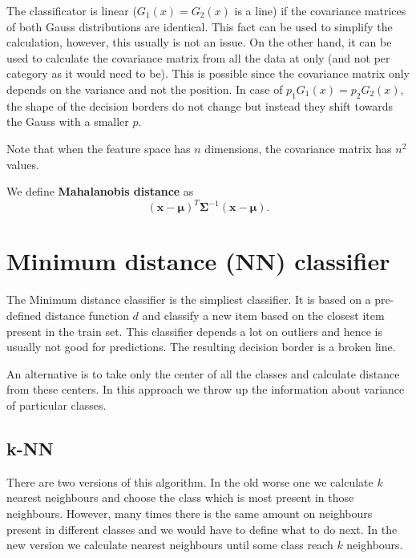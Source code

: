 \begin{remark}
The classificator is linear ($G_1(x)=G_2(x)$ is a line) if the covariance matrices of both Gauss distributions are identical. This fact can be used to simplify the calculation, however, this usually is not an issue. On the other hand, it can be used to calculate the covariance matrix from all the data at only (and not per category as it would need to be). This is possible since the covariance matrix only depends on the variance and not the position. In case of $p_1G_1(x)=p_2G_2(x)$, the shape of the decision borders do not change but instead they shift towards the Gauss with a smaller $p$.
\end{remark}

\begin{remark}
Note that when the feature space has $n$ dimensions, the covariance matrix has $n^2$ values.
\end{remark}

\begin{define}
We define \textbf{Mahalanobis distance} as $$ (\textbf{x}-\boldsymbol{\mu})^T\boldsymbol{\Sigma}^{-1}(\textbf{x}-\boldsymbol{\mu}). $$
\end{define}

\section{Minimum distance (NN) classifier}
The Minimum distance classifier is the simpliest classifier. It is based on a pre-defined distance function $d$ and classify a new item based on the closest item present in the train set. This classifier depends a lot on outliers and hence is usually not good for predictions. The resulting decision border is a broken line.

An alternative is to take only the center of all the classes and calculate distance from these centers. In this approach we throw up the information about variance of particular classes.

\subsection{k-NN}
There are two versions of this algorithm. In the old worse one we calculate $k$ nearest neighbours and choose the class which is most present in those neighbours. However, many times there is the same amount on neighbours present in different classes and we would have to define what to do next. In the new version we calculate nearest neighbours until some class reach $k$ neighbours.


